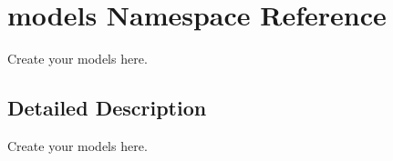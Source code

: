 \hypertarget{namespacemodels}{}\section{models Namespace Reference}
\label{namespacemodels}


Create your models here.  




\subsection{Detailed Description}
Create your models here. 

